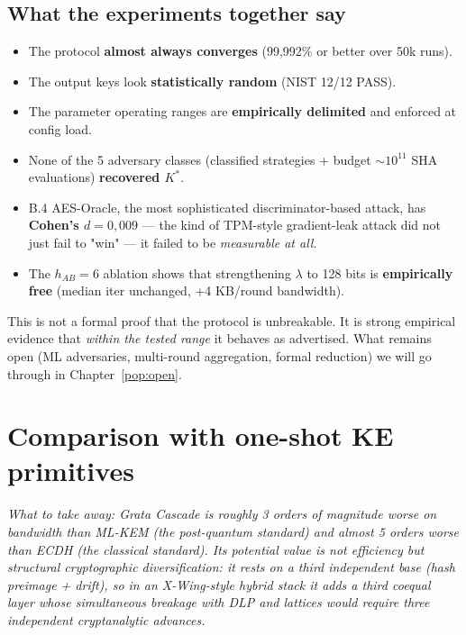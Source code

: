 \documentclass[11pt,a4paper]{article}
\begin{document}
\subsection{What the experiments together say}

\begin{tldr}
\begin{itemize}[leftmargin=*]
\item The protocol \textbf{almost always converges} (99{,}992\% or better over 50k runs).
\item The output keys look \textbf{statistically random} (NIST 12/12 PASS).
\item The parameter operating ranges are \textbf{empirically delimited} and enforced at config load.
\item None of the 5 adversary classes (classified strategies + budget $\sim 10^{11}$ SHA evaluations) \textbf{recovered $K^*$}.
\item B.4 AES-Oracle, the most sophisticated discriminator-based attack, has \textbf{Cohen's $d = 0{,}009$} --- the kind of TPM-style gradient-leak attack did not just fail to "win" --- it failed to be \emph{measurable at all}.
\item The $h_{AB}=6$ ablation shows that strengthening $\lambda$ to 128 bits is \textbf{empirically free} (median iter unchanged, +4 KB/round bandwidth).
\end{itemize}
\end{tldr}

This is not a formal proof that the protocol is unbreakable. It is strong empirical evidence that \emph{within the tested range} it behaves as advertised. What remains open (ML adversaries, multi-round aggregation, formal reduction) we will go through in Chapter~\ref{pop:open}.

\section{Comparison with one-shot KE primitives}\label{pop:comparison}

\noindent\textit{What to take away: Grata Cascade is roughly 3 orders of magnitude worse on bandwidth than ML-KEM (the post-quantum standard) and almost 5 orders worse than ECDH (the classical standard). Its potential value is not efficiency but \emph{structural cryptographic diversification}: it rests on a third independent base (hash preimage + drift), so in an X-Wing-style hybrid stack it adds a third coequal layer whose simultaneous breakage with DLP \emph{and} lattices would require three independent cryptanalytic advances.}
\end{document}
